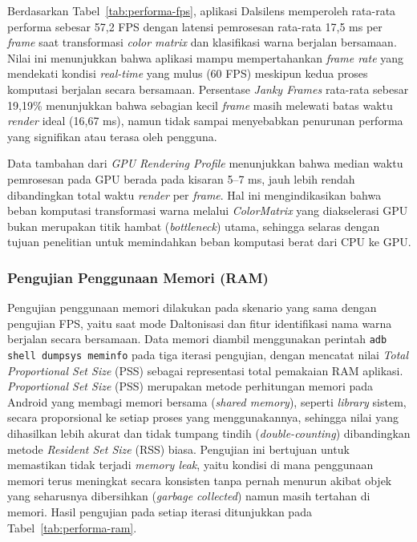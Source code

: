 Berdasarkan Tabel~\ref{tab:performa-fps}, aplikasi Dalsilens memperoleh rata-rata performa sebesar 57,2 FPS dengan latensi pemrosesan rata-rata 17,5 ms per \textit{frame} saat transformasi \textit{color matrix} dan klasifikasi warna berjalan bersamaan.
Nilai ini menunjukkan bahwa aplikasi mampu mempertahankan \textit{frame rate} yang mendekati kondisi \textit{real-time} yang mulus (60 FPS) meskipun kedua proses komputasi berjalan secara bersamaan.
Persentase \textit{Janky Frames} rata-rata sebesar 19,19\% menunjukkan bahwa sebagian kecil \textit{frame} masih melewati batas waktu \textit{render} ideal (16,67 ms), namun tidak sampai menyebabkan penurunan performa yang signifikan atau terasa oleh pengguna.

Data tambahan dari \textit{GPU Rendering Profile} menunjukkan bahwa median waktu pemrosesan pada GPU berada pada kisaran 5--7 ms, jauh lebih rendah dibandingkan total waktu \textit{render} per \textit{frame}.
Hal ini mengindikasikan bahwa beban komputasi transformasi warna melalui \textit{ColorMatrix} yang diakselerasi GPU bukan merupakan titik hambat (\textit{bottleneck}) utama, sehingga selaras dengan tujuan penelitian untuk memindahkan beban komputasi berat dari CPU ke GPU.

\subsubsection{Pengujian Penggunaan Memori (RAM)}

Pengujian penggunaan memori dilakukan pada skenario yang sama dengan pengujian FPS, yaitu saat mode Daltonisasi dan fitur identifikasi nama warna berjalan secara bersamaan.
Data memori diambil menggunakan perintah \texttt{adb shell dumpsys meminfo} pada tiga iterasi pengujian, dengan mencatat nilai \textit{Total Proportional Set Size} (PSS) sebagai representasi total pemakaian RAM aplikasi.
\textit{Proportional Set Size} (PSS) merupakan metode perhitungan memori pada Android yang membagi memori bersama (\textit{shared memory}), seperti \textit{library} sistem, secara proporsional ke setiap proses yang menggunakannya, sehingga nilai yang dihasilkan lebih akurat dan tidak tumpang tindih (\textit{double-counting}) dibandingkan metode \textit{Resident Set Size} (RSS) biasa.
Pengujian ini bertujuan untuk memastikan tidak terjadi \textit{memory leak}, yaitu kondisi di mana penggunaan memori terus meningkat secara konsisten tanpa pernah menurun akibat objek yang seharusnya dibersihkan (\textit{garbage collected}) namun masih tertahan di memori.
Hasil pengujian pada setiap iterasi ditunjukkan pada Tabel~\ref{tab:performa-ram}.

